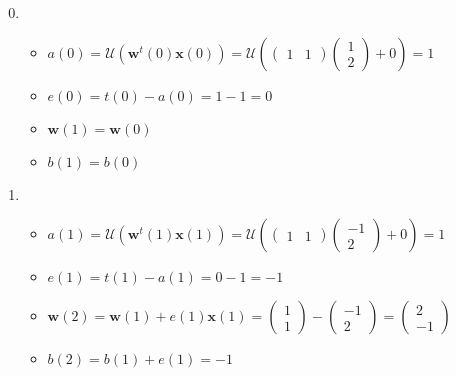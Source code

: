 		\begin{enumerate}[label = \textbf{\arabic*. }]
			\setcounter{enumi}{-1}
			\item \begin{itemize}
				\item $a(0) = \mathcal{U}(\textbf{w}^t(0)\textbf{x}(0)) = \mathcal{U}\left(\begin{pmatrix}1 & 1\end{pmatrix}\begin{pmatrix}
					1\\2 \end{pmatrix} + 0\right) = 1$
				\item $e(0) = t(0) - a(0) = 1 - 1 = 0$
				\item $\textbf{w}(1) = \textbf{w}(0)$
				\item $b(1) = b(0)$
			\end{itemize}
			
			\item \begin{itemize}
				\item $a(1) = \mathcal{U}(\textbf{w}^t(1)\textbf{x}(1)) = \mathcal{U}\left(\begin{pmatrix}1 & 1\end{pmatrix}\begin{pmatrix}
					-1\\2 \end{pmatrix} + 0\right) = 1$
				\item $e(1) = t(1) - a(1) = 0 - 1 = -1$
				\item $\textbf{w}(2) = \textbf{w}(1) + e(1)\textbf{x}(1) = \begin{pmatrix}1\\ 1\end{pmatrix} - \begin{pmatrix}-1\\2\end{pmatrix} = \begin{pmatrix}2\\ -1\end{pmatrix}$
				\item $b(2) = b(1) + e(1) = -1$
			\end{itemize}
			

\end{enumerate}
